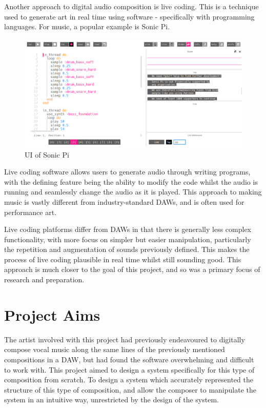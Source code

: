 \documentclass[12pt,a4paper,twoside,openright]{report}
\begin{document}
Another approach to digital audio composition is live coding. This is a technique used to generate art in real time using software - specifically with programming languages. For music, a popular example is Sonic Pi.

\begin{figure}[h]
    \centering
    \includegraphics[scale=0.4]{images/sonicpi.png}
    \caption{UI of Sonic Pi}
    \label{fig:sonic_pi}
\end{figure}

Live coding software allows users to generate audio through writing programs, with the defining feature being the ability to modify the code whilst the audio is running and seamlessly change the audio as it is played. This approach to making music is vastly different from industry-standard DAWs, and is often used for performance art.

Live coding platforms differ from DAWs in that there is generally less complex functionality, with more focus on simpler but easier manipulation, particularly the repetition and augmentation of sounds previously defined. This makes the process of live coding plausible in real time whilst still sounding good. This approach is much closer to the goal of this project, and so was a primary focus of research and preparation.

\section{Project Aims}
The artist involved with this project had previously endeavoured to digitally compose vocal music along the same lines of the previously mentioned compositions in a DAW, but had found the software overwhelming and difficult to work with. This project aimed to design a system specifically for this type of composition from scratch. To design a system which accurately represented the structure of this type of composition, and allow the composer to manipulate the system in an intuitive way, unrestricted by the design of the system.
\end{document}
